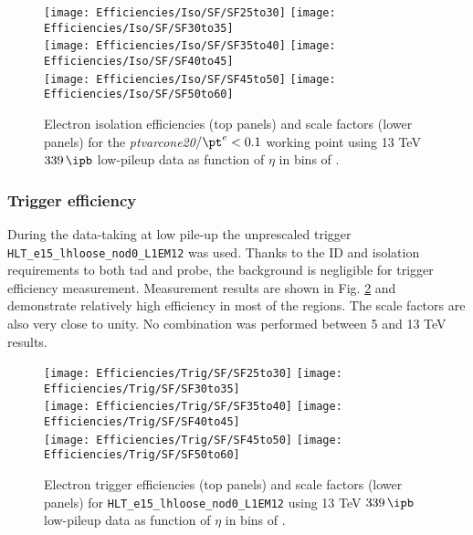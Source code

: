     \begin{figure}[htbp]
    	\centering
    	\texttt{[image: Efficiencies/Iso/SF/SF25to30]}
    	\texttt{[image: Efficiencies/Iso/SF/SF30to35]}\\
    	\texttt{[image: Efficiencies/Iso/SF/SF35to40]}
    	\texttt{[image: Efficiencies/Iso/SF/SF40to45]} \\
    	\texttt{[image: Efficiencies/Iso/SF/SF45to50]}
    	\texttt{[image: Efficiencies/Iso/SF/SF50to60]}
    	\caption{Electron isolation efficiencies (top panels) and scale
    		factors (lower panels) for the \emph{ptvarcone20}$/\pt^e < 0.1$
    		working point using 13 TeV $339\,\ipb$ low-pileup data as function
    		of $\eta$ in bins of \pt.}
    	\label{fig:iso_sf_all}
    \end{figure}
    \subsubsection{Trigger efficiency}
    During the data-taking at low pile-up the unprescaled trigger \texttt{HLT\_e15\_lhloose\_nod0\_L1EM12} was used. Thanks to the ID and isolation requirements to both tad and probe, the background is negligible for trigger efficiency measurement. Measurement results are shown in Fig. \ref{fig:trig_sf_all} and demonstrate relatively high efficiency in most of the regions. The scale factors are also very close to unity. No combination was performed between 5 and 13 TeV results.
    
    \begin{figure}[htbp]
    	\centering
    	\texttt{[image: Efficiencies/Trig/SF/SF25to30]}
    	\texttt{[image: Efficiencies/Trig/SF/SF30to35]}\\
    	\texttt{[image: Efficiencies/Trig/SF/SF35to40]}
    	\texttt{[image: Efficiencies/Trig/SF/SF40to45]} \\
    	\texttt{[image: Efficiencies/Trig/SF/SF45to50]}
    	\texttt{[image: Efficiencies/Trig/SF/SF50to60]}
    	\caption{Electron trigger efficiencies (top panels) and scale
    		factors (lower panels) for \texttt{HLT\_e15\_lhloose\_nod0\_L1EM12}
    		using 13 TeV $339\,\ipb$ low-pileup data as function
    		of $\eta$ in bins of \pt.}
    	\label{fig:trig_sf_all}
    \end{figure}
    
